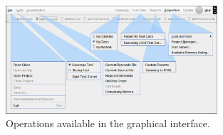 
\begin{figure}[!ht]
\begin{center}
\includegraphics[width=0.7\textwidth]{fig/main-window-editted.eps}
\caption{\label{fig:tool}Operations available in the graphical
interface.}
\end{center}
\end{figure}
